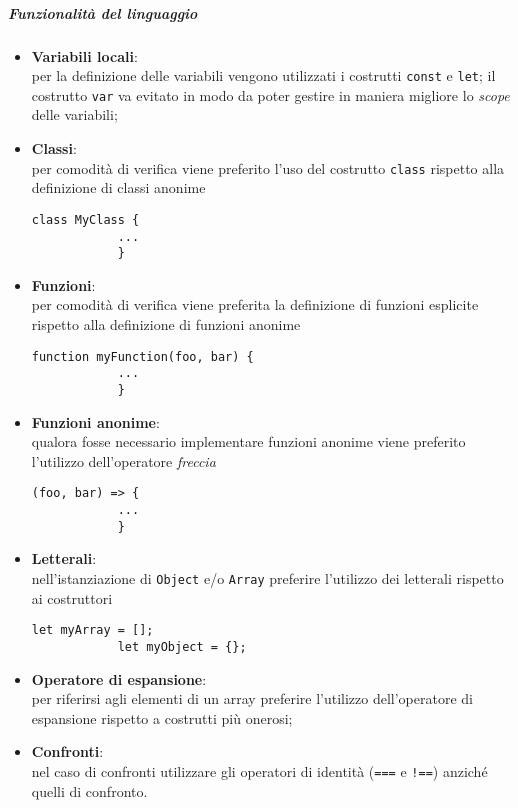 \subparagraph{Funzionalità del linguaggio}

\begin{itemize}
	\item \textbf{Variabili locali}:\\
		per la definizione delle variabili vengono utilizzati i costrutti \texttt{const} e \texttt{let}; il costrutto \texttt{var} va 
		evitato in modo da poter gestire in maniera migliore lo \emph{scope} delle variabili;

	\item \textbf{Classi}:\\
		per comodità di verifica viene preferito l'uso del costrutto \texttt{class} rispetto alla definizione di classi anonime \\
		\begin{lstlisting}[style=htmlcssjs]
			class MyClass {
			...
			}
		\end{lstlisting}

	\item \textbf{Funzioni}:\\
		per comodità di verifica viene preferita la definizione di funzioni esplicite rispetto alla definizione di funzioni anonime \\
		\begin{lstlisting}[style=htmlcssjs]
			function myFunction(foo, bar) {
			...
			}
		\end{lstlisting}

	\item \textbf{Funzioni anonime}:\\
		qualora fosse necessario implementare funzioni anonime viene preferito l'utilizzo dell'operatore \emph{freccia}
		\begin{lstlisting}[style=htmlcssjs]
			(foo, bar) => {
			...
			}
		\end{lstlisting}


	\item \textbf{Letterali}:\\
		nell'istanziazione di \texttt{Object} e/o \texttt{Array} preferire l'utilizzo dei letterali rispetto ai costruttori
		\begin{lstlisting}[style=htmlcssjs]
			let myArray = [];
			let myObject = {};
		\end{lstlisting}

	\item \textbf{Operatore di espansione}:\\
		per riferirsi agli elementi di un array preferire l'utilizzo dell'operatore di espansione rispetto a costrutti più onerosi;

	\item \textbf{Confronti}:\\
		nel caso di confronti utilizzare gli operatori di identità (\texttt{===} e \texttt{!==}) anziché quelli di confronto.
\end{itemize}


